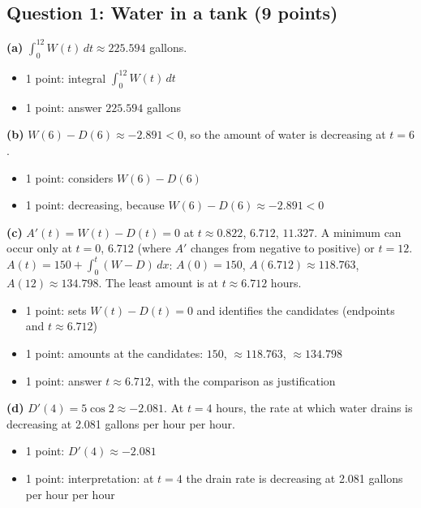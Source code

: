 \documentclass{apcalc}
\begin{document}
\subsection*{Question 1: Water in a tank (9 points)}
\textbf{(a)} $\int_0^{12}W(t)\,dt\approx225.594$ gallons.
\begin{itemize}[leftmargin=1.6em,itemsep=0pt]
\item 1 point: integral $\int_0^{12}W(t)\,dt$
\item 1 point: answer $225.594$ gallons
\end{itemize}
\textbf{(b)} $W(6)-D(6)\approx-2.891<0$, so the amount of water is decreasing at $t=6$.
\begin{itemize}[leftmargin=1.6em,itemsep=0pt]
\item 1 point: considers $W(6)-D(6)$
\item 1 point: decreasing, because $W(6)-D(6)\approx-2.891<0$
\end{itemize}
\textbf{(c)} $A'(t)=W(t)-D(t)=0$ at $t\approx0.822$, $6.712$, $11.327$. A minimum can occur only at $t=0$, $6.712$ (where $A'$ changes from negative to positive) or $t=12$. $A(t)=150+\int_0^t(W-D)\,dx$: $A(0)=150$, $A(6.712)\approx118.763$, $A(12)\approx134.798$. The least amount is at $t\approx6.712$ hours.
\begin{itemize}[leftmargin=1.6em,itemsep=0pt]
\item 1 point: sets $W(t)-D(t)=0$ and identifies the candidates (endpoints and $t\approx6.712$)
\item 1 point: amounts at the candidates: $150$, $\approx118.763$, $\approx134.798$
\item 1 point: answer $t\approx6.712$, with the comparison as justification
\end{itemize}
\textbf{(d)} $D'(4)=5\cos2\approx-2.081$. At $t=4$ hours, the rate at which water drains is decreasing at 2.081 gallons per hour per hour.
\begin{itemize}[leftmargin=1.6em,itemsep=0pt]
\item 1 point: $D'(4)\approx-2.081$
\item 1 point: interpretation: at $t=4$ the drain rate is decreasing at 2.081 gallons per hour per hour
\end{itemize}
\end{document}
